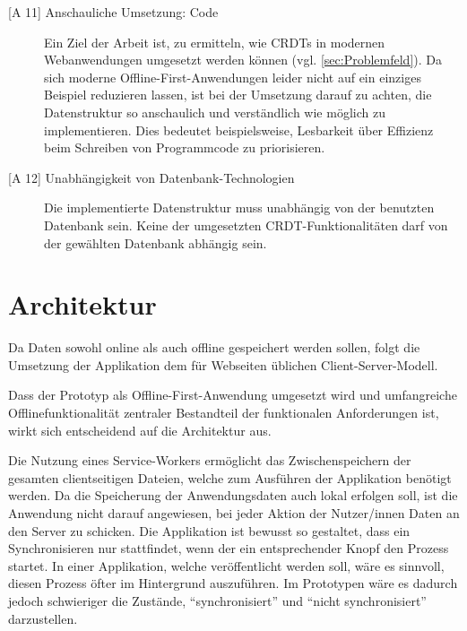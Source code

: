\documentclass[a4paper, 12pt]{scrreprt}
\begin{document}
\begin{description}
	\item[{[A 11]} Anschauliche Umsetzung: Code]
	Ein Ziel der Arbeit ist, zu ermitteln, wie \acp{CRDT} in modernen Webanwendungen umgesetzt werden können (vgl. \ref{sec:Problemfeld}). Da sich moderne Offline-First-Anwendungen leider nicht auf ein einziges Beispiel reduzieren lassen, ist bei der Umsetzung darauf zu achten, die Datenstruktur so anschaulich und verständlich wie möglich zu implementieren. Dies bedeutet beispielsweise, Lesbarkeit über Effizienz beim Schreiben von Programmcode zu priorisieren.
	\item[{[A 12]} Unabhängigkeit von Datenbank-Technologien]
	Die implementierte Datenstruktur muss unabhängig von der benutzten Datenbank sein. Keine der umgesetzten CRDT-Funktionalitäten darf von der gewählten Datenbank abhängig sein.
\end{description}

\section{Architektur}
\label{sec:Architektur}

Da Daten sowohl online als auch offline gespeichert werden sollen, folgt die Umsetzung der Applikation dem für Webseiten üblichen Client-Server-Modell. 

Dass der Prototyp als Offline-First-Anwendung umgesetzt wird und umfangreiche Offlinefunktionalität zentraler Bestandteil der funktionalen Anforderungen ist, wirkt sich entscheidend auf die Architektur aus.

Die Nutzung eines Service-Workers ermöglicht das Zwischenspeichern der gesamten clientseitigen Dateien, welche zum Ausführen der Applikation benötigt werden. Da die Speicherung der Anwendungsdaten auch lokal erfolgen soll, ist die Anwendung nicht darauf angewiesen, bei jeder Aktion der Nutzer/innen Daten an den Server zu schicken. Die Applikation ist bewusst so gestaltet, dass ein Synchronisieren nur stattfindet, wenn der ein entsprechender Knopf den Prozess startet. In einer Applikation, welche veröffentlicht werden soll, wäre es sinnvoll, diesen Prozess öfter im Hintergrund auszuführen. Im Prototypen wäre es dadurch jedoch schwieriger die Zustände, \enquote{synchronisiert} und \enquote {nicht synchronisiert} darzustellen. 
\end{document}
